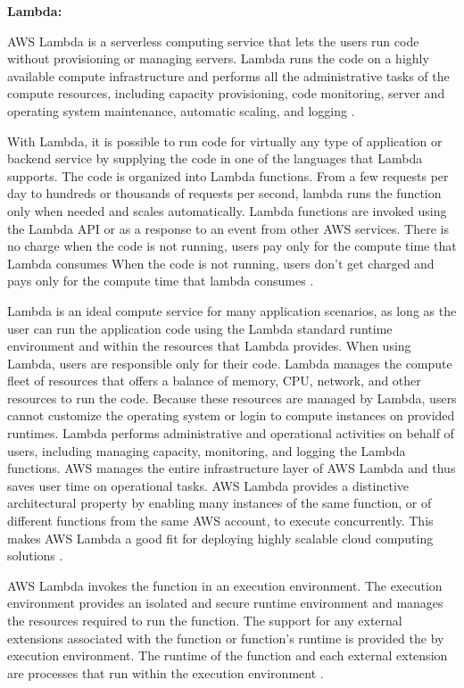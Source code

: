\textbf{Lambda:}
\par AWS Lambda is a serverless computing service that lets the users run code without provisioning or managing servers.
Lambda runs the code on a highly available compute
infrastructure and performs all the administrative tasks
of the compute resources, including capacity provisioning, code monitoring, server and operating system maintenance, automatic scaling, and logging \cite{45}.

\par With Lambda, it is possible to run code for virtually any type of application or backend service by supplying the code in one of the languages that Lambda supports.
The code is organized into Lambda functions.
From a few requests per day to hundreds or thousands of
requests per second, lambda runs the function only when
needed and scales automatically.
Lambda functions are invoked using the Lambda API or as a response to an event from other AWS services.
There is no charge when the code is not running, users pay only for the compute time that Lambda consumes
When the code is not running, users don't get charged
and pays only for the compute time
that lambda consumes \cite{46}.

\par Lambda is an ideal compute service for many application scenarios, as long as the user can run the application code using the Lambda standard runtime environment and within the resources that Lambda provides.
When using Lambda, users are responsible only for their code.
Lambda manages the compute fleet of resources that offers a balance of memory, CPU, network, and other resources to run the code.
Because these resources are managed by Lambda, users cannot customize the operating system or login to compute instances on provided runtimes.
Lambda performs administrative and operational activities on behalf of users, including managing capacity, monitoring, and logging the Lambda functions.
AWS manages the entire infrastructure layer of AWS Lambda
and thus saves user time on operational tasks. AWS Lambda
provides a distinctive architectural property by enabling many instances of the same function, or of different functions from the same AWS account, to execute concurrently. This makes AWS Lambda a good fit for deploying highly scalable cloud computing solutions \cite{46}.

\par AWS Lambda invokes the function in an execution environment.
The execution environment provides an isolated and secure runtime environment and manages the resources required to run the function.
The support for any external extensions associated with
the function or function's runtime is provided the by
execution environment.
The runtime of the function and each external extension are
processes that run within the execution environment
\cite{46}.

